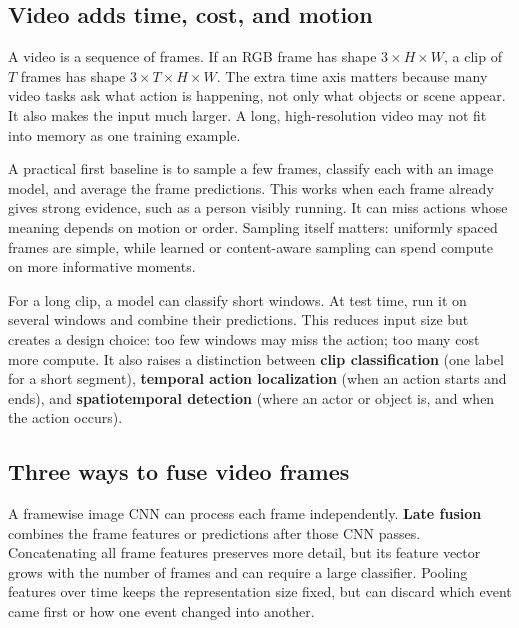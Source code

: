 \subsection{Video adds time, cost, and motion}\label{04-visual-computing-ii-ch031-video-adds-time-cost-and-motion}

\hypertarget{04-visual-computing-ii-ch031-video-adds-time-cost-and-motion}{}

A video is a sequence of frames. If an RGB frame has shape \(3\times H\times W\), a clip of \(T\) frames has shape \(3\times T\times H\times W\). The extra time axis matters because many video tasks ask what action is happening, not only what objects or scene appear. It also makes the input much larger. A long, high-resolution video may not fit into memory as one training example.

A practical first baseline is to sample a few frames, classify each with an image model, and average the frame predictions. This works when each frame already gives strong evidence, such as a person visibly running. It can miss actions whose meaning depends on motion or order. Sampling itself matters: uniformly spaced frames are simple, while learned or content-aware sampling can spend compute on more informative moments.

For a long clip, a model can classify short windows. At test time, run it on several windows and combine their predictions. This reduces input size but creates a design choice: too few windows may miss the action; too many cost more compute. It also raises a distinction between \textbf{clip classification} (one label for a short segment), \textbf{temporal action localization} (when an action starts and ends), and \textbf{spatiotemporal detection} (where an actor or object is, and when the action occurs).

\subsection{Three ways to fuse video frames}\label{04-visual-computing-ii-ch031-three-ways-to-fuse-video-frames}

\hypertarget{04-visual-computing-ii-ch031-three-ways-to-fuse-video-frames}{}

A framewise image CNN can process each frame independently. \textbf{Late fusion} combines the frame features or predictions after those CNN passes. Concatenating all frame features preserves more detail, but its feature vector grows with the number of frames and can require a large classifier. Pooling features over time keeps the representation size fixed, but can discard which event came first or how one event changed into another.

